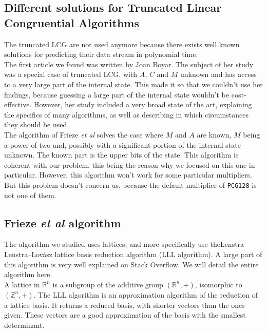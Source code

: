 \documentclass[preprint]{iacrtrans}
\begin{document}
\subsection{Different solutions for Truncated Linear Congruential Algorithms}

The truncated LCG are not used anymore because there exists well known solutions for predicting their data stream in polynomial time.\\

The first article we found was written by Joan Boyar\cite{Boyar1989}. The subject of her study was a special case of truncated LCG, with $A$, $C$ and $M$ unknown and has access to a very large part of the internal state. This made it so that we couldn't use her findings, because guessing a large part of the internal state wouldn't be cost-effective. However, her study included a very broad state of the art, explaining the specifics of many algorithms, as well as describing in which circumstances they should be used.\\

The algorithm of Frieze \textit{et al}\cite{Frieze} solves the case where $M$ and $A$ are known, $M$ being a power of two and, possibly with a significant portion of the internal state unknown. The known part is the upper bits of the state. This algorithm is coherent with our problem, this being the reason why we focused on this one in particular. However, this algorithm won't work for some particular multipliers. But this problem doesn't concern us, because the default multiplier of \texttt{PCG128} is not one of them.\\

\subsection{Frieze \textit{et al} algorithm}

The algorithm we studied uses lattices, and more specifically use the\break Lenstra–Lenstra–Lovász lattice basis reduction algorithm (LLL algorithm)\cite{LLLpastack}. A large part of this algorithm is very well explained on Stack Overflow\cite{LLLstack}.
We will detail the entire algorithm here.\\

A lattice in $\mathbb{R}^n$ is a subgroup of the additive group $(\mathbb{R}^n,+)$, isomorphic to $(\mathbb{Z}^n,+)$. The LLL algorithm is an approximation algorithm of the reduction of a lattice basis. It returns a reduced basis, with shorter vectors than the ones given. These vectors are a good approximation of the basis with the smallest determinant.\\
\end{document}
